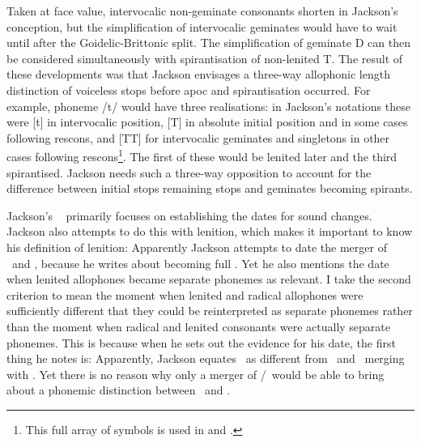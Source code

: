 Taken at face value, intervocalic non-geminate consonants shorten in Jackson's conception, but the simplification of intervocalic geminates would have to wait until after the Goidelic-Brittonic split. The simplification of geminate \gls{D} can then be considered simultaneously with spirantisation of non-lenited \gls{T}. The result of these developments was that Jackson envisages a three-way allophonic length distinction of voiceless stops before \gls{apoc} and spirantisation occurred. For example, \gls{phoneme} /t/ would have three realisations: in Jackson's notations these were [t] in intervocalic position, [T] in absolute initial position and in some cases following  \gls{rescon}s, and [TT] for intervocalic geminates and singletons in other cases following  \gls{rescon}s\footnote{This full array of symbols is used in \textcite{Jac_Gemination60} and \textcite{Jac_Historical67}.}. The first of these would be lenited later and the third spirantised. Jackson needs such a three-way opposition  to account for the difference between initial stops remaining stops and geminates becoming spirants. 


Jackson's ~\autocite*{jackson_language_1953} primarily focuses on establishing the dates for sound changes. Jackson also attempts to do this with lenition, which makes it important to know his definition of lenition:
Apparently Jackson attempts to date the merger of \lT\ and \xD, because he writes about  becoming full . Yet he also mentions the date when lenited allophones became separate \gls{phoneme}s as  relevant. I take the second criterion to mean the moment when lenited and radical allophones were sufficiently different that they could be reinterpreted as separate \gls{phoneme}s rather than the moment when radical and lenited consonants were actually separate \gls{phoneme}s. This is because when he sets out the evidence for his date, the first thing he notes is:
Apparently, Jackson equates  \lT\ as different from \xT\ and  \lT\ merging with \xD. Yet there is no reason why only a merger of \lT/\xD\ would be able to bring about a phonemic distinction between \xT\ and \lT.

